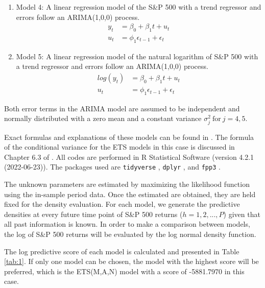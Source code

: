 \documentclass{monashthesis}
\begin{document}
\begin{enumerate}
\def\labelenumi{\arabic{enumi}.}
\setcounter{enumi}{3}
\item
  Model 4: A linear regression model of the S\&P 500 with a trend regressor and errors follow an ARIMA(1,0,0) process.
  \begin{align*}
  y_t &= \beta_0 + \beta_1 t + u_t \\
  u_t &= \phi_1 \epsilon_{t-1} + \epsilon_t
  \end{align*}
\item
  Model 5: A linear regression model of the natural logarithm of S\&P 500 with a trend regressor and errors follow an ARIMA(1,0,0) process.
  \begin{align*}
  log(y_t) &= \beta_0 + \beta_1 t + u_t \\
  u_t &= \phi_1 \epsilon_{t-1} + \epsilon_t
  \end{align*}
\end{enumerate}

Both error terms in the ARIMA model are assumed to be independent and normally distributed with a zero mean and a constant variance \(\sigma_j^2 \ \text{for}\  j = 4,5\).

Exact formulas and explanations of these models can be found in \textcite{fpp3}. The formula of the conditional variance for the ETS models in this case is discussed in Chapter 6.3 of \textcite{HKOS08}. All codes are performed in R Statistical Software (version 4.2.1 (2022-06-23)). The packages used are \texttt{tidyverse} \autocite{tidy19}, \texttt{dplyr} \autocite{dplyr23}, and \texttt{fpp3} \autocite{fpp23}.

The unknown parameters are estimated by maximizing the likelihood function using the in-sample period data. Once the estimated are obtained, they are held fixed for the density evaluation. For each model, we generate the predictive densities at every future time point of S\&P 500 returns (\(h=1,2,...,P\)) given that all past information is known. In order to make a comparison between models, the log of S\&P 500 returns will be evaluated by the log normal density function.

The log predictive score of each model is calculated and presented in Table \ref{tab:1}. If only one model can be chosen, the model with the highest score will be preferred, which is the ETS(M,A,N) model with a score of -5881.7970 in this case.

\vspace{0.3cm}
\end{document}
